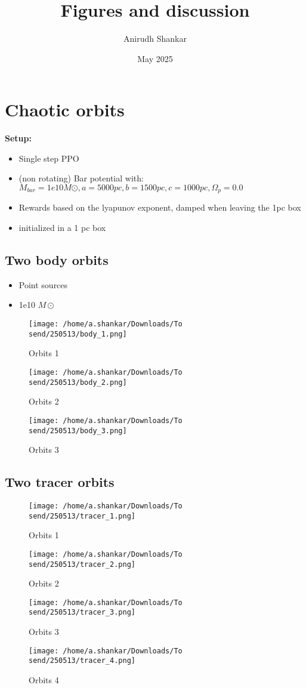 \documentclass{article}
\title{Figures and discussion}
\author{Anirudh Shankar}
\date{May 2025}
\begin{document}
\maketitle

\section{Chaotic orbits}
\textbf{Setup:\\}
\begin{itemize}
    \item Single step PPO
    \item (non rotating) Bar potential with: $M_{bar}=1e10M\odot,a=5000pc,b=1500pc,c=1000pc,\Omega_p=0.0$
    \item Rewards based on the lyapunov exponent, damped when leaving the 1pc box
    \item initialized in a 1 pc box
\end{itemize}
\subsection{Two body orbits}
\begin{itemize}
    \item Point sources
    \item 1e10 $M\odot$
\end{itemize}
\begin{figure}[h!]
    \centering
    \texttt{[image: /home/a.shankar/Downloads/To send/250513/body\_1.png]}
    \caption{Orbits 1}
\end{figure}
\begin{figure}[h!]
    \centering
    \texttt{[image: /home/a.shankar/Downloads/To send/250513/body\_2.png]}
    \caption{Orbits 2}
\end{figure}
\begin{figure}[h!]
    \centering
    \texttt{[image: /home/a.shankar/Downloads/To send/250513/body\_3.png]}
    \caption{Orbits 3}
\end{figure}
\clearpage
\subsection{Two tracer orbits}
\begin{figure}[h!]
    \centering
    \texttt{[image: /home/a.shankar/Downloads/To send/250513/tracer\_1.png]}
    \caption{Orbits 1}
\end{figure}
\begin{figure}[h!]
    \centering
    \texttt{[image: /home/a.shankar/Downloads/To send/250513/tracer\_2.png]}
    \caption{Orbits 2}
\end{figure}
\begin{figure}[h!]
    \centering
    \texttt{[image: /home/a.shankar/Downloads/To send/250513/tracer\_3.png]}
    \caption{Orbits 3}
\end{figure}
\begin{figure}[h!]
    \centering
    \texttt{[image: /home/a.shankar/Downloads/To send/250513/tracer\_4.png]}
    \caption{Orbits 4}
\end{figure}
\clearpage
\end{document}
